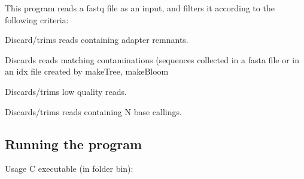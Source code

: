 This program reads a {\ttfamily fastq} file as an input, and filters it according to the following criteria\+:
\begin{DoxyItemize}
\item Discard/trims reads containing adapter remnants.
\item Discards reads matching contaminations (sequences collected in a {\ttfamily fasta} file or in an {\ttfamily idx} file created by {\ttfamily make\+Tree}, {\ttfamily make\+Bloom}
\item Discards/trims low quality reads.
\item Discards/trims reads containing N base callings.
\end{DoxyItemize}

\subsection*{Running the program}

Usage {\ttfamily C} executable (in folder {\ttfamily bin})\+:


